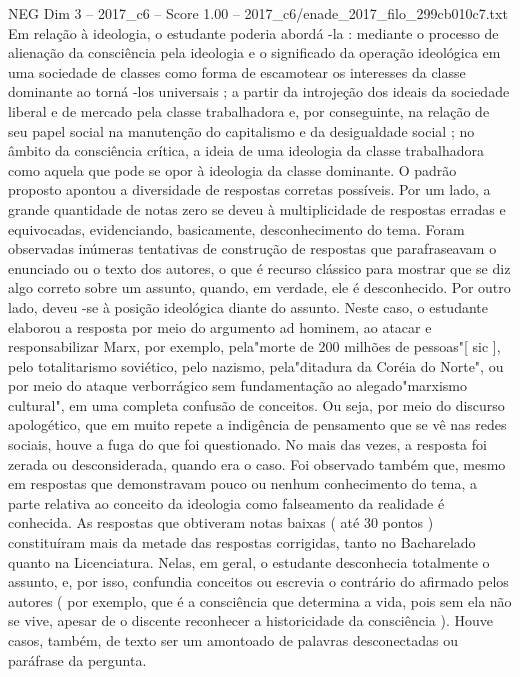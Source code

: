 \begin{textsample}{NEG Dim 3 – 2017\_c6 – Score 1.00 – 2017\_c6/enade\_2017\_filo\_299cb010c7.txt}
Em relação à ideologia, o estudante poderia abordá -la : mediante o processo de alienação da consciência pela ideologia e o significado da operação ideológica em uma sociedade de classes como forma de escamotear os interesses da classe dominante ao torná -los universais ; a partir da introjeção dos ideais da sociedade liberal e de mercado pela classe trabalhadora e, por conseguinte, na relação de seu papel social na manutenção do capitalismo e da desigualdade social ; no âmbito da consciência crítica, a ideia de uma ideologia da classe trabalhadora como aquela que pode se opor à ideologia da classe dominante.
O padrão proposto apontou a diversidade de respostas corretas possíveis.
Por um lado, a grande quantidade de notas zero se deveu à multiplicidade de respostas erradas e equivocadas, evidenciando, basicamente, desconhecimento do tema.
Foram observadas inúmeras tentativas de construção de respostas que parafraseavam o enunciado ou o texto dos autores, o que é recurso clássico para mostrar que se diz algo correto sobre um assunto, quando, em verdade, ele é desconhecido.
Por outro lado, deveu -se à posição ideológica diante do assunto.
Neste caso, o estudante elaborou a resposta por meio do argumento ad hominem, ao atacar e responsabilizar Marx, por exemplo, pela"morte de 200 milhões de pessoas"[ sic ], pelo totalitarismo soviético, pelo nazismo, pela"ditadura da Coréia do Norte", ou por meio do ataque verborrágico sem fundamentação ao alegado"marxismo cultural", em uma completa confusão de conceitos.
Ou seja, por meio do discurso apologético, que em muito repete a indigência de pensamento que se vê nas redes sociais, houve a fuga do que foi questionado.
No mais das vezes, a resposta foi zerada ou desconsiderada, quando era o caso.
Foi observado também que, mesmo em respostas que demonstravam pouco ou nenhum conhecimento do tema, a parte relativa ao conceito da ideologia como falseamento da realidade é conhecida.
As respostas que obtiveram notas baixas ( até 30 pontos ) constituíram mais da metade das respostas corrigidas, tanto no Bacharelado quanto na Licenciatura.
Nelas, em geral, o estudante desconhecia totalmente o assunto, e, por isso, confundia conceitos ou escrevia o contrário do afirmado pelos autores ( por exemplo, que é a consciência que determina a vida, pois sem ela não se vive, apesar de o discente reconhecer a historicidade da consciência ).
Houve casos, também, de texto ser um amontoado de palavras desconectadas ou paráfrase da pergunta.

\end{textsample}
